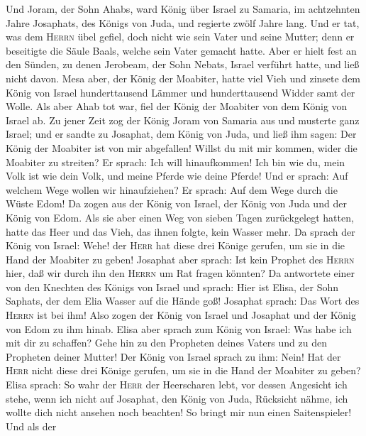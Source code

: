  Und Joram, der Sohn Ahabs, ward König über Israel zu
Samaria, im achtzehnten Jahre Josaphats, des Königs von Juda, und
regierte zwölf Jahre lang.  Und er tat, was dem
\textsc{Herrn} übel gefiel, doch nicht wie sein Vater und seine Mutter;
denn er beseitigte die Säule Baals, welche sein Vater gemacht hatte.
 Aber er hielt fest an den Sünden, zu denen Jerobeam, der
Sohn Nebats, Israel verführt hatte, und ließ nicht davon. 
Mesa aber, der König der Moabiter, hatte viel Vieh und zinsete dem König
von Israel hunderttausend Lämmer und hunderttausend Widder samt der
Wolle.  Als aber Ahab tot war, fiel der König der Moabiter
von dem König von Israel ab.  Zu jener Zeit zog der König
Joram von Samaria aus und musterte ganz Israel;  und er
sandte zu Josaphat, dem König von Juda, und ließ ihm sagen: Der König
der Moabiter ist von mir abgefallen! Willst du mit mir kommen, wider die
Moabiter zu streiten? Er sprach: Ich will hinaufkommen! Ich bin wie du,
mein Volk ist wie dein Volk, und meine Pferde wie deine Pferde!
 Und er sprach: Auf welchem Wege wollen wir hinaufziehen?
Er sprach: Auf dem Wege durch die Wüste Edom!  Da zogen
aus der König von Israel, der König von Juda und der König von Edom. Als
sie aber einen Weg von sieben Tagen zurückgelegt hatten, hatte das Heer
und das Vieh, das ihnen folgte, kein Wasser mehr.  Da
sprach der König von Israel: Wehe! der \textsc{Herr} hat diese drei
Könige gerufen, um sie in die Hand der Moabiter zu geben!
 Josaphat aber sprach: Ist kein Prophet des
\textsc{Herrn} hier, daß wir durch ihn den \textsc{Herrn} um Rat fragen
könnten? Da antwortete einer von den Knechten des Königs von Israel und
sprach: Hier ist Elisa, der Sohn Saphats, der dem Elia Wasser auf die
Hände goß!  Josaphat sprach: Das Wort des \textsc{Herrn}
ist bei ihm! Also zogen der König von Israel und Josaphat und der König
von Edom zu ihm hinab.  Elisa aber sprach zum König von
Israel: Was habe ich mit dir zu schaffen? Gehe hin zu den Propheten
deines Vaters und zu den Propheten deiner Mutter! Der König von Israel
sprach zu ihm: Nein! Hat der \textsc{Herr} nicht diese drei Könige
gerufen, um sie in die Hand der Moabiter zu geben?  Elisa
sprach: So wahr der \textsc{Herr} der Heerscharen lebt, vor dessen
Angesicht ich stehe, wenn ich nicht auf Josaphat, den König von Juda,
Rücksicht nähme, ich wollte dich nicht ansehen noch beachten!
 So bringt mir nun einen Saitenspieler! Und als der
